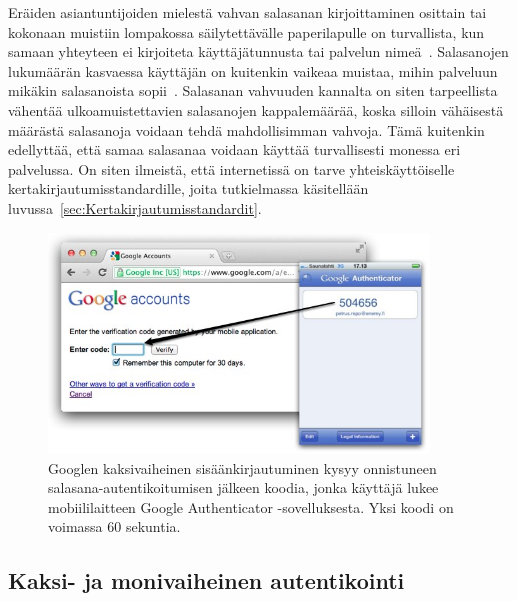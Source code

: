 \documentclass[finnish,gradu]{tktltiki}
\begin{document}
  Eräiden asiantuntijoiden mielestä vahvan salasanan kirjoittaminen osittain tai kokonaan muistiin lompakossa säilytettävälle paperilapulle on turvallista, kun samaan yhteyteen ei kirjoiteta käyttäjätunnusta tai palvelun nimeä~\cite{fsecure_passwords_on_postit_09, schneier_changing_passwords_10, schneier_choosing_passwords_07, schneier_write_down_your_password_05}. Salasanojen lukumäärän kasvaessa käyttäjän on kuitenkin vaikeaa muistaa, mihin palveluun mikäkin salasanoista sopii~\cite{study_of_passwords_07}. Salasanan vahvuuden kannalta on siten tarpeellista vähentää ulkoamuistettavien salasanojen kappalemäärää, koska silloin vähäisestä määrästä salasanoja voidaan tehdä mahdollisimman vahvoja. Tämä kuitenkin edellyttää, että samaa salasanaa voidaan käyttää turvallisesti monessa eri palvelussa. On siten ilmeistä, että internetissä on tarve yhteiskäyttöiselle kertakirjautumisstandardille, joita tutkielmassa käsitellään luvussa~\ref{sec:Kertakirjautumisstandardit}.



  \begin{figure}[h!]
    \centering
    \includegraphics[width=0.9\textwidth]{images/google_authenticator.jpg}
    \caption[Googlen kaksivaiheinen sisäänkirjautuminen.]{Googlen kaksivaiheinen sisäänkirjautuminen kysyy onnistuneen salasana-autentikoitumisen jälkeen koodia, jonka käyttäjä lukee mobiililaitteen Google Authenticator -sovelluksesta. Yksi koodi on voimassa 60 sekuntia.}
    \label{fig:google_authenticator}
  \end{figure}

  \subsection{Kaksi- ja monivaiheinen autentikointi} %
  \label{sub:kaksivaiheinen_autentikointi}
\end{document}
